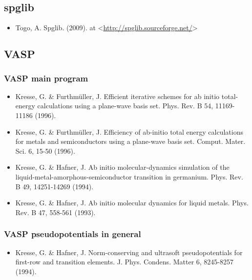 \documentclass[letterpaper,10pt,english]{sphinxmanual}
\begin{document}
\subsection{spglib}
\label{15_0_citations:spglib}\begin{itemize}
\item {} 
Togo, A. Spglib. (2009). at \textless{}\href{http://spglib.sourceforge.net/}{http://spglib.sourceforge.net/}\textgreater{}

\end{itemize}


\subsection{VASP}
\label{15_0_citations:vasp}

\subsubsection{VASP main program}
\label{15_0_citations:vasp-main-program}\begin{itemize}
\item {} 
Kresse, G. \& Furthmüller, J. Efficient iterative schemes for ab initio total-energy calculations using a plane-wave basis set. Phys. Rev. B 54, 11169-11186 (1996).

\item {} 
Kresse, G. \& Furthmüller, J. Efficiency of ab-initio total energy calculations for metals and semiconductors using a plane-wave basis set. Comput. Mater. Sci. 6, 15-50 (1996).

\item {} 
Kresse, G. \& Hafner, J. Ab initio molecular-dynamics simulation of the liquid-metal-amorphous-semiconductor transition in germanium. Phys. Rev. B 49, 14251-14269 (1994).

\item {} 
Kresse, G. \& Hafner, J. Ab initio molecular dynamics for liquid metals. Phys. Rev. B 47, 558-561 (1993).

\end{itemize}


\subsubsection{VASP pseudopotentials in general}
\label{15_0_citations:vasp-pseudopotentials-in-general}\begin{itemize}
\item {} 
Kresse, G. \& Hafner, J. Norm-conserving and ultrasoft pseudopotentials for first-row and transition elements. J. Phys. Condens. Matter 6, 8245-8257 (1994).

\end{itemize}
\end{document}
